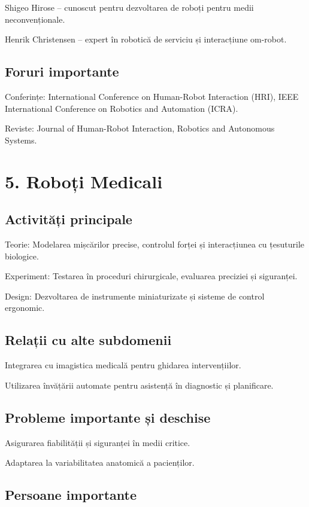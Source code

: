 \documentclass[12pt]{article}
\begin{document}
Shigeo Hirose – cunoscut pentru dezvoltarea de roboți pentru medii neconvenționale.

Henrik Christensen – expert în robotică de serviciu și interacțiune om-robot.

\subsection*{Foruri importante}

Conferințe: International Conference on Human-Robot Interaction (HRI), IEEE International Conference on Robotics and Automation (ICRA).

Reviste: Journal of Human-Robot Interaction, Robotics and Autonomous Systems.

\section{5. Roboți Medicali}

\subsection*{Activități principale}

Teorie: Modelarea mișcărilor precise, controlul forței și interacțiunea cu țesuturile biologice.

Experiment: Testarea în proceduri chirurgicale, evaluarea preciziei și siguranței.

Design: Dezvoltarea de instrumente miniaturizate și sisteme de control ergonomic.

\subsection*{Relații cu alte subdomenii}

Integrarea cu imagistica medicală pentru ghidarea intervențiilor.

Utilizarea învățării automate pentru asistență în diagnostic și planificare.

\subsection*{Probleme importante și deschise}

Asigurarea fiabilității și siguranței în medii critice.

Adaptarea la variabilitatea anatomică a pacienților.

\subsection*{Persoane importante}
\end{document}
